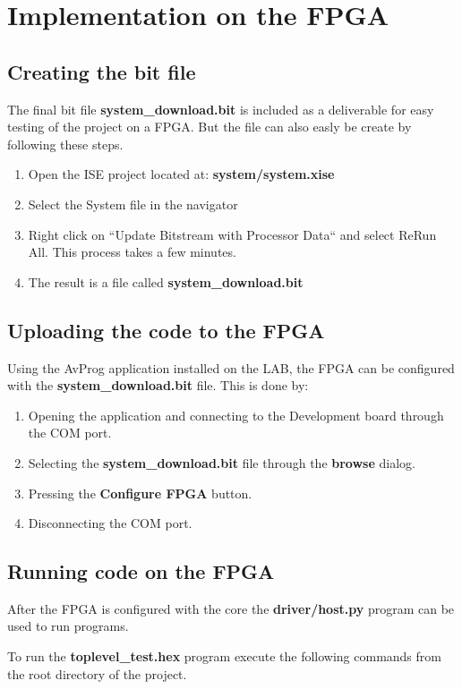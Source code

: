 \section{Implementation on the FPGA}

\subsection{Creating the bit file}
The final bit file {\bf system\_download.bit} is included as a deliverable for easy testing of the project on a FPGA. But the file can also easly be create by following these steps.


\begin{enumerate}
	\item Open the ISE project located at:
		{\bf system/system.xise}
	\item Select the System file in the navigator
  \item Right click on ``Update Bitstream with Processor Data`` and select ReRun All. This process takes a few minutes. 
	\item The result is a file called {\bf system\_download.bit}
\end{enumerate}


\subsection{Uploading the code to the FPGA}
Using the AvProg application installed on the LAB, the FPGA can be configured with the {\bf system\_download.bit} file.
This is done by:

\begin{enumerate}
\item Opening the application and connecting to the Development board through the COM port.
\item Selecting the {\bf system\_download.bit} file through the {\bf browse} dialog. 
\item Pressing the {\bf Configure FPGA} button.
\item Disconnecting the COM port. 
\end{enumerate}  

\subsection{Running code on the FPGA}
After the FPGA is configured with the core the {\bf driver/host.py} program can be used to run programs.

To run the {\bf toplevel\_test.hex} program execute the following commands from the root directory of the project.

